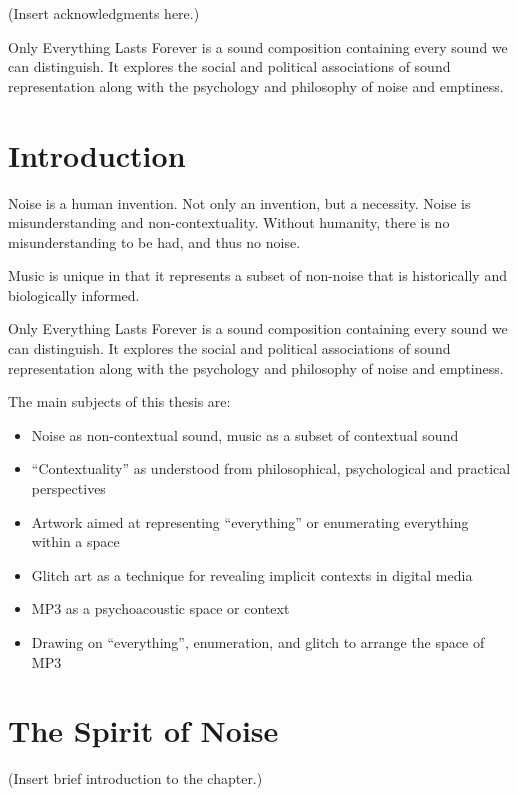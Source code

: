 \documentclass{thesis}
\author{Kyle McDonald}
\begin{document}
 
\titlepage
\tableofcontents

(Insert acknowledgments here.)

Only Everything Lasts Forever is a sound composition containing every sound we can distinguish. It explores the social and political associations of sound representation along with the psychology and philosophy of noise and emptiness.

\chapter{Introduction}
Noise is a human invention. Not only an invention, but a necessity. Noise is misunderstanding and non-contextuality. Without humanity, there is no misunderstanding to be had, and thus no noise.

Music is unique in that it represents a subset of non-noise that is historically and biologically informed.

Only Everything Lasts Forever is a sound composition containing every sound we can distinguish. It explores the social and political associations of sound representation along with the psychology and philosophy of noise and emptiness.

The main subjects of this thesis are:

\begin{itemize}
	\item Noise as non-contextual sound, music as a subset of contextual sound
	\item ``Contextuality'' as understood from philosophical, psychological and practical perspectives
	\item Artwork aimed at representing ``everything'' or enumerating everything within a space
	\item Glitch art as a technique for revealing implicit contexts in digital media
	\item MP3 as a psychoacoustic space or context
	\item Drawing on ``everything'', enumeration, and glitch to arrange the space of MP3
\end{itemize}

\chapter{The Spirit of Noise}
(Insert brief introduction to the chapter.)
\end{document}
